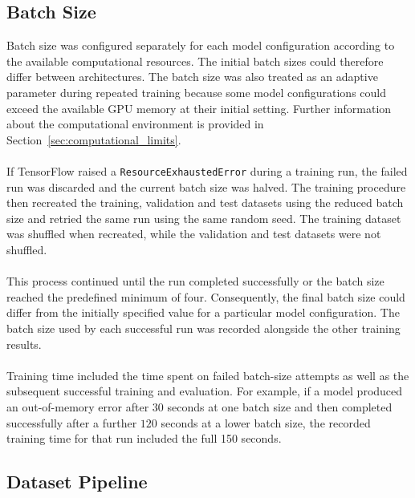 \documentclass[12pt, a4paper]{report}
\let\oldsubsection\subsection
\renewcommand{\subsection}{%
    \Needspace{6\baselineskip}%
    \oldsubsection
}
\begin{document}
			\subsection{Batch Size}
					
				Batch size was configured separately for each model configuration according to the available computational resources. The initial batch sizes could therefore differ between architectures. The batch size was also treated as an adaptive parameter during repeated training because some model configurations could exceed the available GPU memory at their initial setting. Further information about the computational environment is provided in Section~\ref{sec:computational_limits}.\\\\
				If TensorFlow raised a \texttt{ResourceExhaustedError} during a training run, the failed run was discarded and the current batch size was halved. The training procedure then recreated the training, validation and test datasets using the reduced batch size and retried the same run using the same random seed. The training dataset was shuffled when recreated, while the validation and test datasets were not shuffled.\\\\
				This process continued until the run completed successfully or the batch size reached the predefined minimum of four. Consequently, the final batch size could differ from the initially specified value for a particular model configuration. The batch size used by each successful run was recorded alongside the other training results.\\\\
				Training time included the time spent on failed batch-size attempts as well as the subsequent successful training and evaluation. For example, if a model produced an out-of-memory error after $30$ seconds at one batch size and then completed successfully after a further $120$ seconds at a lower batch size, the recorded training time for that run included the full 150 seconds.
					
			\subsection{Dataset Pipeline}
				
\end{document}

